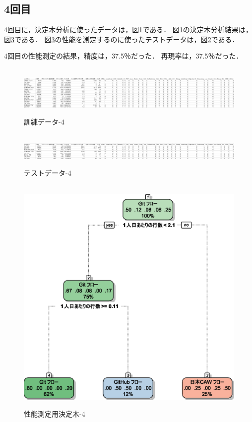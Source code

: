 \subsection{4回目}
4回目に，決定木分析に使ったデータは，図\ref{データ4-1}である．
図\ref{データ4-1}の決定木分析結果は，図\ref{決定木4}である．
図\ref{決定木4}の性能を測定するのに使ったテストデータは，図\ref{データ4-2}である．

4回目の性能測定の結果，精度は，37.5％だった．
再現率は，37.5％だった．

\begin{figure}[H]
\centering　
\includegraphics[width=13cm]{4-1.png}
\caption{訓練データ-4}\label{データ4-1}
\end{figure}
\begin{figure}[H]
\centering　
\includegraphics[width=13cm]{4-2.png}
\caption{テストデータ-4}\label{データ4-2}
\end{figure}
\begin{figure}[H]
\centering　
\includegraphics[width=13cm]{4.eps}
\caption{性能測定用決定木-4}\label{決定木4}
\end{figure}


